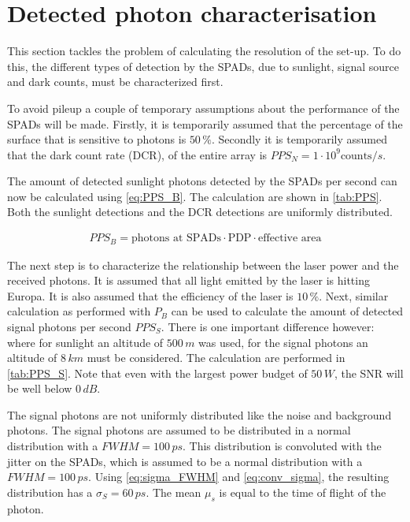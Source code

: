 \section{Detected photon characterisation} 
\label{ssec:detected_photon_characterisation}
This section tackles the problem of calculating the resolution of the set-up. To do this, the different types of detection by the SPADs, due to sunlight, signal source and dark counts, must be characterized first.

To avoid pileup a couple of temporary assumptions about the performance of the SPADs will be made. Firstly, it is temporarily assumed that the percentage of the surface that is sensitive to photons is $50\,\%$. Secondly it is temporarily assumed that the dark count rate (DCR), of the entire array is $PPS_N=1\cdot10^9 \text{counts}/s$.

The amount of detected sunlight photons detected by the SPADs per second can now be calculated using \cref{eq:PPS_B}. The calculation are shown in \cref{tab:PPS}. Both the sunlight detections and the DCR detections are uniformly distributed.

\begin{align}\label{eq:PPS_B}
PPS_B = \text{photons at SPADs}\cdot \text{PDP} \cdot \text{effective area}
\end{align}



The next step is to characterize the relationship between the laser power and the received photons. It is assumed that all light emitted by the laser is hitting Europa. It is also assumed that the efficiency of the laser is $10\,\%$. Next, similar calculation as performed with $P_B$ can be used to calculate the amount of detected signal photons per second $PPS_S$. There is one important difference however: where for sunlight an altitude of $500\,m$ was used, for the signal photons an altitude of $8\,km$ must be considered. The calculation are performed in \cref{tab:PPS_S}. Note that even with the largest power budget of $50\,W$, the SNR will be well below $0\,dB$.



The signal photons are not uniformly distributed like the noise and background photons. The signal photons are assumed to be distributed in a normal distribution with a $FWHM=100\,ps$. This distribution is convoluted with the jitter on the SPADs, which is assumed to be a normal distribution with a  $FWHM=100\,ps$. Using \cref{eq:sigma_FWHM} and \cref{eq:conv_sigma}, the resulting distribution has a $\sigma_S=60\,ps$. The mean $\mu_s$ is equal to the time of flight of the photon.

